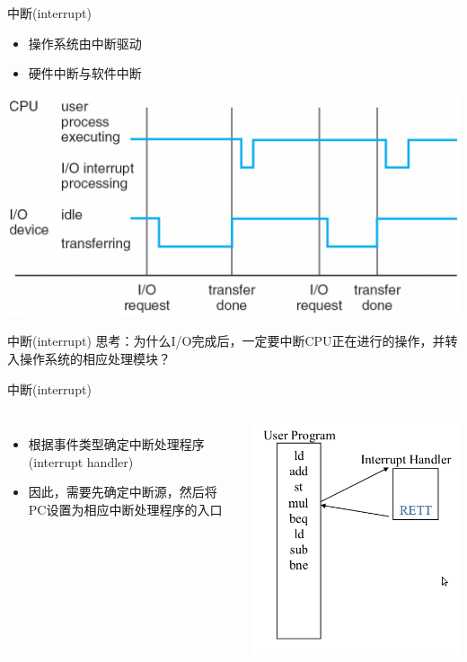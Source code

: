 \documentclass[xcolor=svgnames]{beamer}
\begin{document}
\begin{CJK*}{UTF8}{gbsn}
\begin{frame}{中断(interrupt)}
\begin{itemize}
\item 操作系统由中断驱动
\item 硬件中断与软件中断
\end{itemize}
\includegraphics[width=1.0\textwidth]{interrupt.png}
\end{frame}

\begin{frame}{中断(interrupt)}
思考：为什么I/O完成后，一定要中断CPU正在进行的操作，并转入操作系统的相应处理模块？
\end{frame}

\begin{frame}{中断(interrupt)}
\begin{columns}
\begin{itemize}
\item 根据事件类型确定中断处理程序(interrupt handler)
\item 因此，需要先确定中断源，然后将PC设置为相应中断处理程序的入口
\end{itemize}
\includegraphics[width=1.0\textwidth]{int.png}
\end{columns}
\end{frame}


\end{CJK*}
\end{document}

